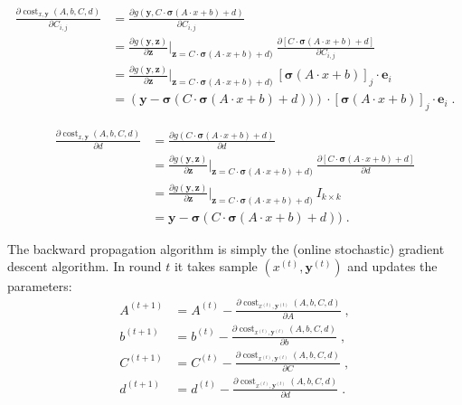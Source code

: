 \documentclass[12pt]{article}
\DeclareMathOperator{\cost}{cost}
\newcommand{\bsigma}{\pmb{\sigma}}
\newcommand{\y}{\mathbf{y}}
\newcommand{\z}{\mathbf{z}}
\newcommand{\e}{\mathbf{e}}
\begin{document}
\begin{align*}
\frac{\partial \cost_{x,\y}(A,b,C,d)}{\partial C_{i,j}}
& = \frac{\partial g(\y, C \cdot \bsigma(A \cdot x + b) + d)}{\partial C_{i,j}} \\
& = \frac{\partial g(\y, \z)}{\partial \z}\bigg|_{\z=C \cdot \bsigma(A \cdot x + b) + d)} \ \frac{\partial [C \cdot \bsigma(A \cdot x + b) + d]}{\partial C_{i,j}} \\
& = \frac{\partial g(\y, \z)}{\partial \z}\bigg|_{\z=C \cdot \bsigma(A \cdot x + b) + d)} \ [\bsigma(A \cdot x + b)]_j \cdot \e_i \\
& = \left(\y - \bsigma(C \cdot \bsigma(A \cdot x + b) + d)) \right) \cdot [\bsigma(A \cdot x + b)]_j \cdot \e_i \; .
\end{align*}

\begin{align*}
\frac{\partial \cost_{x,\y}(A,b,C,d)}{\partial d}
& = \frac{\partial g(C \cdot \bsigma(A \cdot x + b) + d)}{\partial d} \\
& = \frac{\partial g(\y, \z)}{\partial \z}\bigg|_{\z=C \cdot \bsigma(A \cdot x + b) + d)} \ \frac{\partial [C \cdot \bsigma(A \cdot x + b) + d]}{\partial d} \\
& = \frac{\partial g(\y, \z)}{\partial \z}\bigg|_{\z=C \cdot \bsigma(A \cdot x + b) + d)} \ I_{k \times k} \\
& = \y - \bsigma(C \cdot \bsigma(A \cdot x + b) + d)) \; .
\end{align*}

The backward propagation algorithm is simply the (online stochastic) gradient descent algorithm.
In round $t$ it takes sample $(x^{(t)}, \y^{(t)})$ and updates the parameters:
\begin{align*}
A^{(t+1)} & = A^{(t)} - \frac{\partial \cost_{x^{(t)},\y^{(t)}}(A,b,C,d)}{\partial A} \; , \\
b^{(t+1)} & = b^{(t)} - \frac{\partial \cost_{x^{(t)},\y^{(t)}}(A,b,C,d)}{\partial b} \; , \\
C^{(t+1)} & = C^{(t)} - \frac{\partial \cost_{x^{(t)},\y^{(t)}}(A,b,C,d)}{\partial C} \; , \\
d^{(t+1)} & = d^{(t)} - \frac{\partial \cost_{x^{(t)},\y^{(t)}}(A,b,C,d)}{\partial d} \; .
\end{align*}
\end{document}
